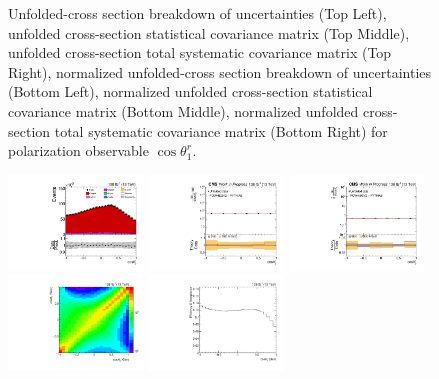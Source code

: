 \begin{figure}[htb]
\begin{center}
\caption{Unfolded-cross section breakdown of uncertainties (Top Left), unfolded cross-section statistical covariance matrix (Top Middle), unfolded cross-section total systematic covariance matrix (Top Right), normalized unfolded-cross section breakdown of uncertainties (Bottom Left), normalized unfolded cross-section statistical covariance matrix (Bottom Middle), normalized unfolded cross-section total systematic covariance matrix (Bottom Right) for polarization observable $\cos\theta_{1}^{r}$.}
\label{fig:b1r_uncertainties}
\end{center}
\end{figure}
\clearpage
\begin{figure}[htb]
\begin{center}
 \includegraphics[width=0.32\textwidth]{fig_fullRun2UL/controlplots/combined/Hyp_LeptonBr.pdf}
 \includegraphics[width=0.32\textwidth]{fig_fullRun2UL/unfolding/combined/UnfoldedResults_b2r.pdf}
 \includegraphics[width=0.32\textwidth]{fig_fullRun2UL/unfolding/combined/UnfoldedResultsNorm_b2r.pdf} \\
 \includegraphics[width=0.32\textwidth]{fig_fullRun2UL/unfolding/combined/ResponseMatrix_b2r.pdf}
 \includegraphics[width=0.32\textwidth]{fig_fullRun2UL/unfolding/combined/TotEff_b2r.pdf}

\end{center}
\end{figure}
